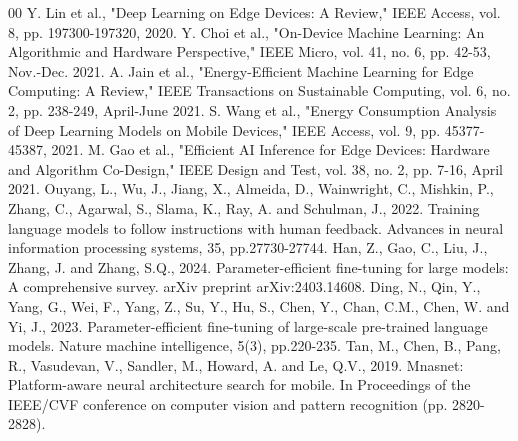\documentclass[11pt]{IEEEtran}
\begin{document}
\begin{thebibliography}{00}
 Y. Lin et al., "Deep Learning on Edge Devices: A Review," IEEE Access, vol. 8, pp. 197300-197320, 2020.
 Y. Choi et al., "On-Device Machine Learning: An Algorithmic and Hardware Perspective," IEEE Micro, vol. 41, no. 6, pp. 42-53, Nov.-Dec. 2021.
 A. Jain et al., "Energy-Efficient Machine Learning for Edge Computing: A Review," IEEE Transactions on Sustainable Computing, vol. 6, no. 2, pp. 238-249, April-June 2021.
 S. Wang et al., "Energy Consumption Analysis of Deep Learning Models on Mobile Devices," IEEE Access, vol. 9, pp. 45377-45387, 2021.
 M. Gao et al., "Efficient AI Inference for Edge Devices: Hardware and Algorithm Co-Design," IEEE Design and Test, vol. 38, no. 2, pp. 7-16, April 2021.
 Ouyang, L., Wu, J., Jiang, X., Almeida, D., Wainwright, C., Mishkin, P., Zhang, C., Agarwal, S., Slama, K., Ray, A. and Schulman, J., 2022. Training language models to follow instructions with human feedback. Advances in neural information processing systems, 35, pp.27730-27744.
 Han, Z., Gao, C., Liu, J., Zhang, J. and Zhang, S.Q., 2024. Parameter-efficient fine-tuning for large models: A comprehensive survey. arXiv preprint arXiv:2403.14608.
 Ding, N., Qin, Y., Yang, G., Wei, F., Yang, Z., Su, Y., Hu, S., Chen, Y., Chan, C.M., Chen, W. and Yi, J., 2023. Parameter-efficient fine-tuning of large-scale pre-trained language models. Nature machine intelligence, 5(3), pp.220-235. 
Tan, M., Chen, B., Pang, R., Vasudevan, V., Sandler, M., Howard, A. and Le, Q.V., 2019. Mnasnet: Platform-aware neural architecture search for mobile. In Proceedings of the IEEE/CVF conference on computer vision and pattern recognition (pp. 2820-2828).
\end{thebibliography}
\end{document}
